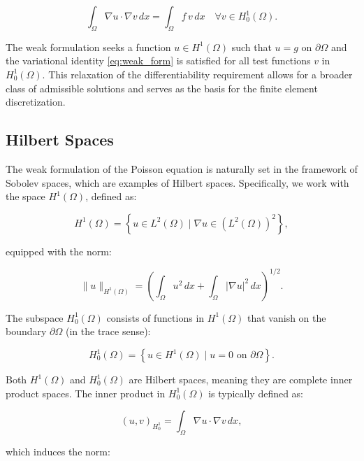 \documentclass[12pt]{article}
\begin{document}
\begin{equation}
\int_{\Omega} \nabla u \cdot \nabla v \, dx = \int_{\Omega} f\, v \, dx \quad \forall v \in H^1_0(\Omega).
\label{eq:weak_form}
\end{equation}

The weak formulation seeks a function $u \in H^1(\Omega)$ such that $u = g$ on $\partial \Omega$ and the variational identity \eqref{eq:weak_form} is satisfied for all test functions $v$ in $H^1_0(\Omega)$. This relaxation of the differentiability requirement allows for a broader class of admissible solutions and serves as the basis for the finite element discretization.


\subsection{Hilbert Spaces}

The weak formulation of the Poisson equation is naturally set in the framework of Sobolev spaces, which are examples of Hilbert spaces. Specifically, we work with the space $H^1(\Omega)$, defined as:

\begin{equation}
H^1(\Omega) = \left\{ u \in L^2(\Omega) \; \big| \; \nabla u \in (L^2(\Omega))^2 \right\},
\end{equation}

equipped with the norm:

\begin{equation}
\| u \|_{H^1(\Omega)} = \left( \int_\Omega u^2 \, dx + \int_\Omega |\nabla u|^2 \, dx \right)^{1/2}.
\end{equation}

The subspace $H^1_0(\Omega)$ consists of functions in $H^1(\Omega)$ that vanish on the boundary $\partial \Omega$ (in the trace sense):

\begin{equation}
H^1_0(\Omega) = \left\{ u \in H^1(\Omega) \; \big| \; u = 0 \text{ on } \partial\Omega \right\}.
\end{equation}

Both $H^1(\Omega)$ and $H^1_0(\Omega)$ are Hilbert spaces, meaning they are complete inner product spaces. The inner product in $H^1_0(\Omega)$ is typically defined as:

\begin{equation}
(u, v)_{H^1_0} = \int_\Omega \nabla u \cdot \nabla v \, dx,
\end{equation}

which induces the norm:
\end{document}
